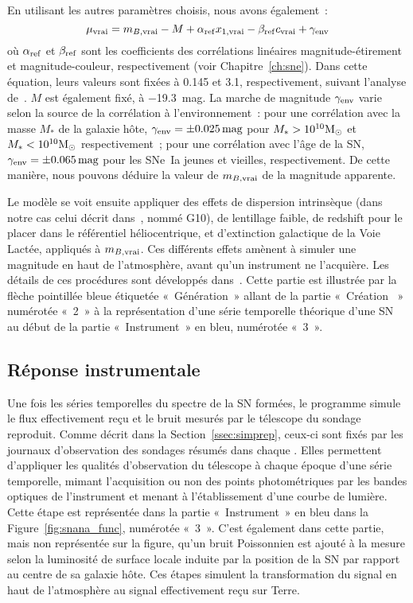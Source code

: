 \documentclass[../main/main.tex]{subfiles}
\begin{document}
En utilisant les autres paramètres choisis, nous avons également~:
\begin{equation}\label{eq:mutrue}
    \mu_{\rm vrai} = m_{B, \rm vrai} - M + \alpha_{\rm ref} x_{1, \rm vrai} -
    \beta_{\rm ref} c_{\rm vrai}+ \gamma_{\rm env}
\end{equation}
où $\alpha_{\rm ref}$ et $\beta_{\rm ref}$ sont les coefficients des
corrélations linéaires magnitude-étirement et magnitude-couleur, respectivement
(voir Chapitre~\ref{ch:sne}). Dans cette équation, leurs valeurs sont fixées à
\num{0.145} et \num{3.1}, respectivement, suivant l'analyse
de~\cite{popovic2021a}. $M$ est également fixé, à \SI{-19.3}{mag}. La marche de
magnitude $\gamma_{\rm env}$ varie selon la source de la corrélation à
l'environnement~: pour une corrélation avec la masse $M_*$ de la galaxie hôte,
$\gamma_{\rm env} = \pm \SI{0.025}{mag}$ pour $M_* > 10^{10}\si{\Msun}$ et $M_*
< 10^{10}\si{\Msun}$ respectivement~; pour une corrélation avec l'âge de la SN,
$\gamma_{\rm env} = \pm \SI{0.065}{mag}$ pour les SNe~Ia jeunes et vieilles,
respectivement. De cette manière, nous pouvons déduire la valeur de $m_{B, \rm
vrai}$ de la magnitude apparente.

Le modèle se voit ensuite appliquer des effets de dispersion intrinsèque (dans
notre cas celui décrit dans~\cite{guy2010}, nommé
G10), de lentillage faible, de redshift pour le
placer dans le référentiel héliocentrique, et d'extinction galactique de la Voie
Lactée, appliqués à $m_{B, \rm vrai}$. Ces différents effets amènent à simuler
une magnitude en haut de l'atmosphère, avant qu'un instrument ne l'acquière. Les
détails de ces procédures sont développés dans~\cite{kessler2019}. Cette partie
est illustrée par la flèche pointillée bleue étiquetée «~Génération~» allant de
la partie «~Création \hostlib~» numérotée «~2~» à la représentation d'une série
temporelle théorique d'une SN au début de la partie «~Instrument~» en bleu,
numérotée «~3~».

\subsection{Réponse instrumentale}\label{ssec:siminst}

Une fois les séries temporelles du spectre de la SN formées, le programme simule
le flux effectivement reçu et le bruit mesurés par le télescope du sondage
reproduit. Comme décrit dans la Section~\ref{ssec:simprep}, ceux-ci sont fixés
par les journaux d'observation des sondages résumés dans chaque \simlib. Elles
permettent d'appliquer les qualités d'observation du télescope à chaque époque
d'une série temporelle, mimant l'acquisition ou non des points photométriques
par les bandes optiques de l'instrument et menant à l'établissement d'une courbe
de lumière. Cette étape est représentée dans la partie «~Instrument~» en bleu
dans la Figure~\ref{fig:snana_func}, numérotée «~3~». C'est également dans cette
partie, mais non représentée sur la figure, qu'un bruit Poissonnien est ajouté à
la mesure selon la luminosité de surface locale induite par la position de la SN
par rapport au centre de sa galaxie hôte. Ces étapes simulent la transformation
du signal en haut de l'atmosphère au signal effectivement reçu sur Terre.
\end{document}
